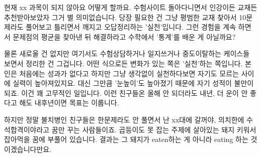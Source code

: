 현재 xx 과목이 되지 않아요 어떻게 할까요.
수험사이트 돌아다니면서 인강이든 교재든 추천받아보았자 그거 별 의미없습니다.
당장 필요한 건 그냥 평범한 교재 찾아서 10문제라도 풀어보고 틀리면서 깨지고 오답정리하는 '실천'입니다.
그런 경험을 계속 하면서 문제점의 평균을 찾아낸 뒤 해결하라고 수학에서 '통계'를 배운 게 아닐까요?
\vspace{5mm}

물론 새로울 건 없지만 여기서도 수험상담하거나 일지쓰거나 중도이탈하는 케이스들 보면서 정리한 건 그겁니다.
어떤 식으로든 변화가 있는 쪽은 '실천'하는 쪽입니다. 본인은 처음에는 성과가 없다고 하지만 그냥 생각없이 실천하다보면
자기도 모르는 사이에 실력이 높아져있지요. 대신 그만큼 '눈높이'도 높아졌기 때문에 자기 성적이 불만이 되죠.
이건 꽤 고무적인 일입니다. 이런 친구들온 올해 안 되더라도 내년, 더 운이 안 좋다고 해도 내후년이면 목표는 이룹니다.
\vspace{5mm}

하지만 정말 불치병인 친구들은 한문제라도 안 풀면서 난 xx대에 갈꺼야, 의치한에 수석합격이야라고 꿈만 꾸는 사람들이죠.
곱등이도 못 잡는 주제에 살아있는 돼지 키워서 잡아먹을 꿈에 부풀어 있습니다.
결과는 그 돼지가 eaten하는 게 아니라 eating 하는 것이겠습니다만요.
\vspace{5mm}

